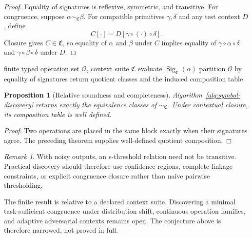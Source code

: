 \documentclass[11pt]{article}
\newtheorem{proposition}[theorem]{Proposition}
\theoremstyle{definition}
\theoremstyle{remark}
\newtheorem{remark}[theorem]{Remark}
\newcommand{\Sig}{\operatorname{Sig}}
\begin{document}
\begin{proof}
Equality of signatures is reflexive, symmetric, and transitive. For congruence, suppose \(\alpha\sim_{\mathfrak C}\beta\). For compatible primitives \(\gamma,\delta\) and any test context \(D\), define
\[
C[\cdot]=D[\gamma\circ(\cdot)\circ\delta].
\]
Closure gives \(C\in\mathfrak C\), so equality of \(\alpha\) and \(\beta\) under \(C\) implies equality of \(\gamma\circ\alpha\circ\delta\) and \(\gamma\circ\beta\circ\delta\) under \(D\).
\end{proof}

\begin{algorithm}[ht]
\caption{Finite observational symbol discovery}
\label{alg:symbol-discovery}
\begin{algorithmic}[1]
\Require finite typed operation set \(\mathcal O\), context suite \(\mathfrak C\)
  \State evaluate \(\Sig_{\mathfrak C}(\alpha)\)
\EndFor
\State partition \(\mathcal O\) by equality of signatures
\State return quotient classes and the induced composition table
\end{algorithmic}
\end{algorithm}

\begin{proposition}[Relative soundness and completeness]
Algorithm~\ref{alg:symbol-discovery} returns exactly the equivalence classes of \(\sim_{\mathfrak C}\). Under contextual closure, its composition table is well defined.
\end{proposition}

\begin{proof}
Two operations are placed in the same block exactly when their signatures agree. The preceding theorem supplies well-defined quotient composition.
\end{proof}

\begin{remark}
With noisy outputs, an \(\epsilon\)-threshold relation need not be transitive. Practical discovery should therefore use confidence regions, complete-linkage constraints, or explicit congruence closure rather than naive pairwise thresholding.
\end{remark}

\begin{placeholderbox}
The finite result is relative to a declared context suite. Discovering a minimal task-sufficient congruence under distribution shift, continuous operation families, and adaptive adversarial contexts remains open. The conjecture above is therefore narrowed, not proved in full.
\end{placeholderbox}
\end{document}
